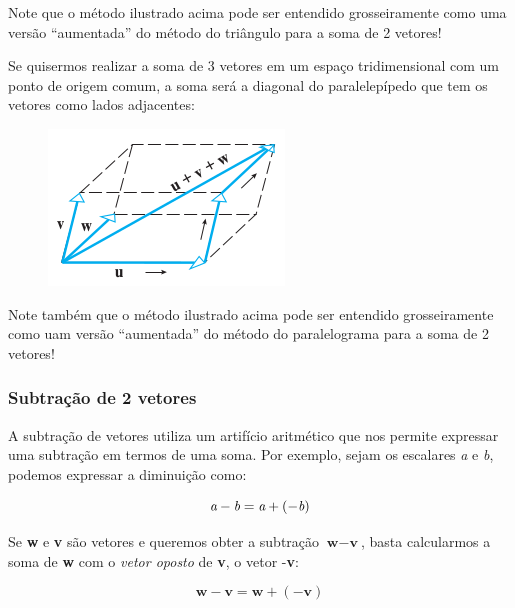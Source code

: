 \documentclass[pdftex, brazil, 12pt, twoside]{article}
\newcommand{\vet}[1]{\textbf{#1}}
\newcommand{\esc}[1]{\emph{#1}}
\begin{document}
Note que o método ilustrado acima pode ser entendido grosseiramente como
uma versão ``aumentada'' do método do triângulo para a soma de 2 vetores!

Se quisermos realizar a soma de 3 vetores em um espaço tridimensional com
um ponto de origem comum, a soma será a diagonal do paralelepípedo que tem
os vetores como lados adjacentes:

\begin{figure}[H]
  \begin{center}
    \includegraphics[scale=0.6]{imagens/vet011.png}
  \end{center}
\end{figure}

Note também que o método ilustrado acima pode ser entendido grosseiramente
como uam versão ``aumentada'' do método do paralelograma para a soma de
2 vetores!

\subsubsection{Subtração de 2 vetores}
\label{evd-geom-bi-tri-n-dimen-subtracao-2}

A subtração de vetores utiliza um artifício aritmético que nos permite expressar
uma subtração em termos de uma soma. Por exemplo, sejam os escalares \esc{a} e
\esc{b}, podemos expressar a diminuição como:

\begin{equation}
  \esc{a} - \esc{b} = \esc{a} + (-\esc{b})
\end{equation}

Se \vet{w} e \vet{v} são vetores e queremos obter a subtração $\vet{w} - \vet{v}$,
basta calcularmos a soma de \vet{w} com o \emph{vetor oposto} de \vet{v}, o vetor
-\vet{v}:

\begin{equation}
  \vet{w} - \vet{v} = \vet{w} + (-\vet{v})
\end{equation}
\end{document}
